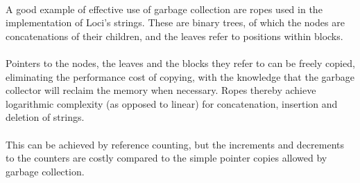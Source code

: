 \documentclass[12pt,twoside,notitlepage]{report}
\begin{document}
\paragraph{}
A good example of effective use of garbage collection are ropes used in the implementation of Loci's strings. These are binary trees, of which the nodes are concatenations of their children, and the leaves refer to positions within blocks.

\paragraph{}
Pointers to the nodes, the leaves and the blocks they refer to can be freely copied, eliminating the performance cost of copying, with the knowledge that the garbage collector will reclaim the memory when necessary. Ropes thereby achieve logarithmic complexity (as opposed to linear) for concatenation, insertion and deletion of strings.

\paragraph{}
This can be achieved by reference counting, but the increments and decrements to the counters are costly compared to the simple pointer copies allowed by garbage collection.
\end{document}
